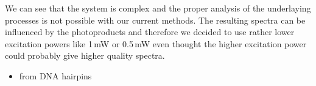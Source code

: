 We can see that the system is complex and the proper analysis of the
underlaying processes is not possible with our current methods. The resulting
spectra can be influenced by the photoproducts and therefore we decided to use
rather lower excitation powers like 1\,mW or 0.5\,mW even thought the higher
excitation power could probably give higher quality spectra.

\begin{itemize}
	\item from DNA hairpins
\end{itemize}
